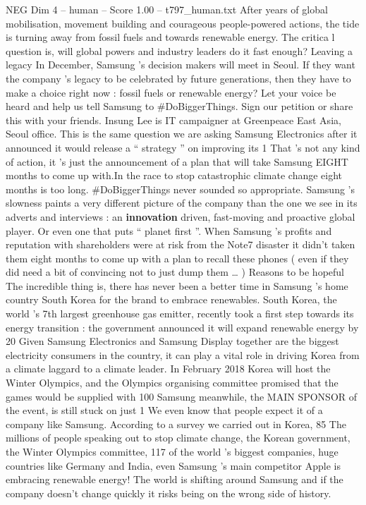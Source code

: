 \begin{textsample}{NEG Dim 4 – human – Score 1.00 – t797\_human.txt}  \label{ex:f4_neg_049}
After years of global mobilisation, movement building and courageous people-powered actions, the tide is turning away from fossil fuels and towards renewable energy.
The critica l question is, will global powers and industry leaders do it fast enough?
Leaving a legacy In December, Samsung ’s decision makers will meet in Seoul.
If they want the company ’s legacy to be celebrated by future generations, then they have to make a choice right now : fossil fuels or renewable energy?
Let your voice be heard and help us tell Samsung to \#DoBiggerThings.
Sign our petition or share this with your friends.
Insung Lee is IT campaigner at Greenpeace East Asia, Seoul office.
This is the same question we are asking Samsung Electronics after it announced it would release a “ strategy ” on improving its 1 %
That ’s not any kind of action, it ’s just the announcement of a plan that will take Samsung EIGHT months to come up with.In the race to stop catastrophic climate change eight months is too long. \#DoBiggerThings never sounded so appropriate.
Samsung ’s slowness paints a very different picture of the company than the one we see in its adverts and interviews : an \textbf{innovation} driven, fast-moving and proactive global player.
Or even one that puts “ planet first ”.
When Samsung ’s profits and reputation with shareholders were at risk from the Note7 disaster it didn't taken them eight months to come up with a plan to recall these phones ( even if they did need a bit of convincing not to just dump them … ) Reasons to be hopeful The incredible thing is, there has never been a better time in Samsung ’s home country South Korea for the brand to embrace renewables.
South Korea, the world ’s 7th largest greenhouse gas emitter, recently took a first step towards its energy transition : the government announced it will expand renewable energy by 20 %
Given Samsung Electronics and Samsung Display together are the biggest electricity consumers in the country, it can play a vital role in driving Korea from a climate laggard to a climate leader.
In February 2018 Korea will host the Winter Olympics, and the Olympics organising committee promised that the games would be supplied with 100 %
Samsung meanwhile, the MAIN SPONSOR of the event, is still stuck on just 1 %
We even know that people expect it of a company like Samsung.
According to a survey we carried out in Korea, 85 %
The millions of people speaking out to stop climate change, the Korean government, the Winter Olympics committee, 117 of the world ’s biggest companies, huge countries like Germany and India, even Samsung ’s main competitor Apple is embracing renewable energy!
The world is shifting around Samsung and if the company doesn't change quickly it risks being on the wrong side of history.

\end{textsample}
